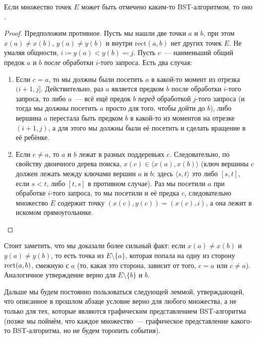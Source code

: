 \begin{theorem}\label{bst_to_arbs} Если множество точек $E$ может быть отмечено каким-то BST-алгоритмом,
то оно \arbs.
\end{theorem}
\begin{proof} Предположим противное. Пусть мы нашли две точки $a$ и $b$, при этом
$x(a) \neq x(b)$, $y(a) \neq y(b)$ и внутри $\mathrm{rect}(a, b)$ нет других точек $E$. 
Не умаляя общности, $i \coloneqq y(a) < y(b)\eqqcolon j$. Пусть $c$~--- наименьший общий предок $a$ и $b$ \emph{после} обработки $i$-того запроса.
Есть два случая:
\begin{enumerate}
\item Если $c = a$, то мы должны были посетить $a$ в какой-то момент из отрезка $(i + 1, j]$. Действительно, раз $a$ является предком $b$ после обработки $i$-того запроса, то либо $a$~--- всё ещё предок $b$ \emph{перед} обработкой $j$-того запроса (и тогда мы должны посетить $a$ просто для того, чтобы дойти до $b$), либо вершина $a$ перестала быть предком $b$ в какой-то из моментов на отрезке $(i + 1, j)$, а для этого мы должны были её посетить и сделать вращение в её ребёнке.

\item Если $c \neq a$, то $a$ и $b$ лежат в разных поддеревьях $c$. Следовательно, по свойству двоичного дерева поиска, $x(c) \in \langle x(a), x(b) \rangle$ (ключ вершины $c$ должен лежать между ключами вершин $a$ и $b$; здесь $\langle s, t \rangle$ это либо $[s, t]$, если $s < t$, либо $[t, s]$ в противном случае). Раз мы посетили $a$ при обработке $i$-того
запроса, то мы посетили и её предка $c$, следовательно множество $E$ содержит точку $(x(c), y(c)) = (x(c), i)$, а она лежит в искомом прямоугольнике.
\end{enumerate}
\end{proof}

Стоит заметить, что мы доказали более сильный факт: если $x(a) \neq x(b)$ и $y(a) \neq y(b)$, то есть точка из $E \setminus \{a \}$, которая попала на одну из сторону $\operatorname{rect}(a, b)$, смежную с $a$ (то, какая это сторона, зависит от того, $c = a$ или $c \neq a$). Аналогичное утверждение верно для $E \setminus \{ b \}$ и $b$. 

Дальше мы будем постоянно пользоваться следующей леммой, утверждающей, что описанное в прошлом абзаце условие верно для любого \arbs множества, а не только для тех, которые
являются графическим представлением BST-алгоритма (позже мы поймём, что каждое
\arbs множество~--- графическое представление какого-то BST-алгоритма, но не будем торопить события).

